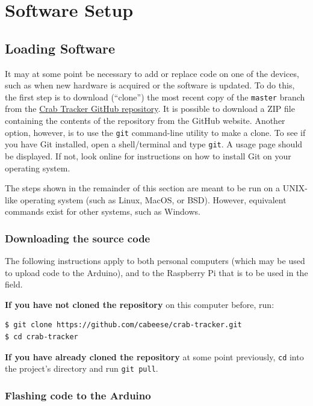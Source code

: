 \documentclass[12pt]{article}
\begin{document}
\section{Software Setup}

\subsection{Loading Software}

It may at some point be necessary to add or replace code on one of the devices,
such as when new hardware is acquired or the software is updated.
To do this, the first step is to download (``clone'') the most recent copy
of the \texttt{master} branch from the
\href{https://github.com/cabeese/crab-tracker/}
{Crab Tracker GitHub repository}.
It is possible to download a ZIP file containing the contents of the repository
from the GitHub website.
Another option, however, is to use the \texttt{git} command-line utility to
make a clone.
To see if you have Git installed, open a shell/terminal and type \texttt{git}.
A usage page should be displayed.
If not, look online for instructions on how to install Git on your operating
system.

The steps shown in the remainder of this section are meant to be run on a
UNIX-like operating system (such as Linux, MacOS, or BSD).
However, equivalent commands exist for other systems, such as Windows.

\subsubsection{Downloading the source code}\label{sec:git}

The following instructions apply to both personal computers (which may be
used to upload code to the Arduino), and to the Raspberry Pi that is to be used
in the  field.

\textbf{If you have not cloned the repository} on this computer before, run:

\begin{lstlisting}[language=bash]
$ git clone https://github.com/cabeese/crab-tracker.git
$ cd crab-tracker
\end{lstlisting}

\textbf{If you have already cloned the repository} at some point previously,
\texttt{cd} into the project's directory and run \texttt{git pull}.

\subsubsection{Flashing code to the Arduino}
\end{document}
